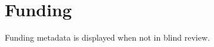 \documentclass[config/load-project=false,document/type=paper,metadata/author={INSR Example Author},metadata/institution={INSR Example Institution},metadata/title={Funded Research Paper Example},metadata/funding={Supported by Example Agency grant EX-123.},metadata/conflict-of-interest={The authors declare no competing interests.},metadata/ethics={No human participants were involved.}]{insr}
\begin{document}
\INSRMakeTitle\section{Funding}Funding metadata is displayed when not in blind review.
\end{document}
